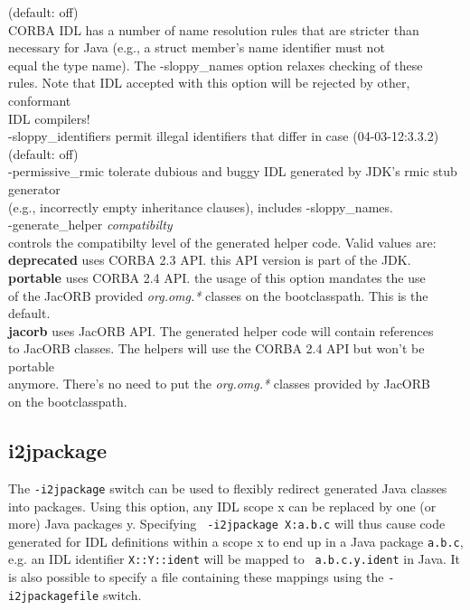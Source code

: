 \begin{tabbing}
(default: off)\\
\> \> CORBA IDL has a number of  name resolution rules that are
stricter than\\
\> \> necessary for Java (e.g., a struct member's name identifier must
not \\
\> \> equal the type name). The -sloppy\_names option relaxes checking of
these \\
\> \>  rules. Note that IDL accepted with this option will be rejected
by other, conformant  \\
\> \> IDL compilers!\\
\> -sloppy\_identifiers \> permit illegal identifiers that differ in case (04-03-12:3.3.2) (default: off)\\
\> -permissive\_rmic  \>  tolerate dubious and buggy IDL generated by
JDK's rmic stub generator\\
\> \> (e.g., incorrectly empty inheritance clauses), includes -sloppy\_names.\\
\> -generate\_helper \emph{compatibilty} \\
\> \> controls the compatibilty level of the generated helper code. Valid values are: \\
\> \> {\bf deprecated} uses CORBA 2.3 API. this API version is part of the JDK.\\
\> \> {\bf portable} uses CORBA 2.4 API. the usage of this option mandates the use \\
\> \> of the JacORB provided \emph{org.omg.*} classes on the bootclasspath. This is the default. \\
\> \> {\bf jacorb} uses JacORB API. The generated helper code will contain references \\
\> \> to JacORB classes. The helpers will use the CORBA 2.4 API but won't be portable \\
\> \> anymore. There's no need to put the \emph{org.omg.*} classes provided by JacORB \\
\> \> on the bootclasspath.
\end{tabbing}

\subsection*{i2jpackage}
The {\tt -i2jpackage} switch can be used to flexibly redirect
generated Java classes into packages. Using this option, any IDL scope
x can be replaced by one (or more) Java packages y. Specifying {\tt
  -i2jpackage X:a.b.c} will thus cause code generated for IDL
definitions within a scope x to end up in a Java package {\tt a.b.c},
e.g. an IDL identifier {\tt X::Y::ident} will be mapped to {\tt
  a.b.c.y.ident} in Java. It is also possible to specify a file
containing these mappings using the {\tt -i2jpackagefile} switch.

